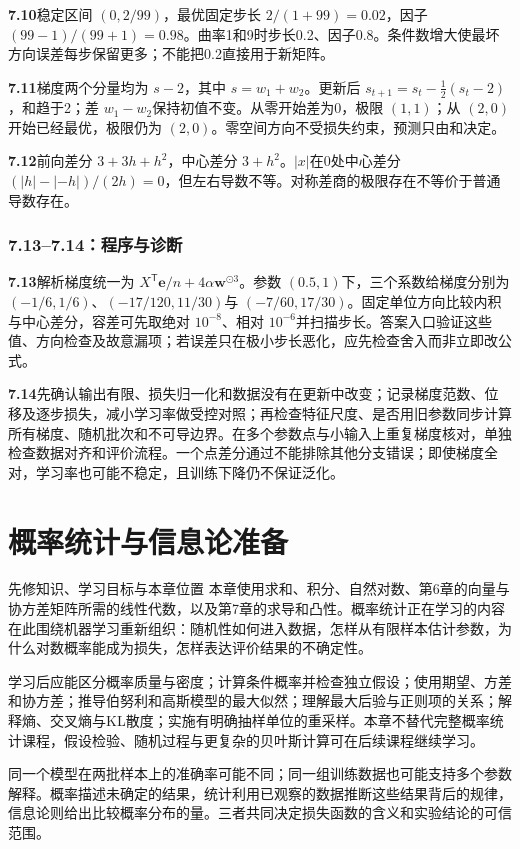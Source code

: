 \documentclass[UTF8,fontset=none,zihao=-4,a4paper]{ctexart}
\newcommand{\chapterpage}[1]{\clearpage\section{#1}}
\numberwithin{equation}{section}
\numberwithin{figure}{section}
\begin{document}
\textbf{7.10}\quad 稳定区间 $(0,2/99)$，最优固定步长 $2/(1+99)=0.02$，因子 $(99-1)/(99+1)=0.98$。曲率1和9时步长0.2、因子0.8。条件数增大使最坏方向误差每步保留更多；不能把0.2直接用于新矩阵。

\textbf{7.11}\quad 梯度两个分量均为 $s-2$，其中 $s=w_1+w_2$。更新后 $s_{t+1}=s_t-\frac12(s_t-2)$，和趋于2；差 $w_1-w_2$保持初值不变。从零开始差为0，极限 $(1,1)$；从 $(2,0)$开始已经最优，极限仍为 $(2,0)$。零空间方向不受损失约束，预测只由和决定。

\textbf{7.12}\quad 前向差分 $3+3h+h^2$，中心差分 $3+h^2$。$|x|$在0处中心差分 $(|h|-|-h|)/(2h)=0$，但左右导数不等。对称差商的极限存在不等价于普通导数存在。

\subsubsection*{7.13--7.14：程序与诊断}
\textbf{7.13}\quad 解析梯度统一为 $X^{\mathsf T}\symbf e/n+4\alpha\symbf w^{\odot3}$。参数 $(0.5,1)$下，三个系数给梯度分别为 $(-1/6,1/6)$、$(-17/120,11/30)$与 $(-7/60,17/30)$。固定单位方向比较内积与中心差分，容差可先取绝对 $10^{-8}$、相对 $10^{-6}$并扫描步长。答案入口验证这些值、方向检查及故意漏项；若误差只在极小步长恶化，应先检查舍入而非立即改公式。

\textbf{7.14}\quad 先确认输出有限、损失归一化和数据没有在更新中改变；记录梯度范数、位移及逐步损失，减小学习率做受控对照；再检查特征尺度、是否用旧参数同步计算所有梯度、随机批次和不可导边界。在多个参数点与小输入上重复梯度核对，单独检查数据对齐和评价流程。一个点差分通过不能排除其他分支错误；即使梯度全对，学习率也可能不稳定，且训练下降仍不保证泛化。

\chapterpage{概率统计与信息论准备}\label{ch:probability}
\begin{infobox}{先修知识、学习目标与本章位置}
本章使用求和、积分、自然对数、第6章的向量与协方差矩阵所需的线性代数，以及第7章的求导和凸性。概率统计正在学习的内容在此围绕机器学习重新组织：随机性如何进入数据，怎样从有限样本估计参数，为什么对数概率能成为损失，怎样表达评价结果的不确定性。

学习后应能区分概率质量与密度；计算条件概率并检查独立假设；使用期望、方差和协方差；推导伯努利和高斯模型的最大似然；理解最大后验与正则项的关系；解释熵、交叉熵与KL散度；实施有明确抽样单位的重采样。本章不替代完整概率统计课程，假设检验、随机过程与更复杂的贝叶斯计算可在后续课程继续学习。
\end{infobox}
同一个模型在两批样本上的准确率可能不同；同一组训练数据也可能支持多个参数解释。概率描述未确定的结果，统计利用已观察的数据推断这些结果背后的规律，信息论则给出比较概率分布的量。三者共同决定损失函数的含义和实验结论的可信范围。
\end{document}
